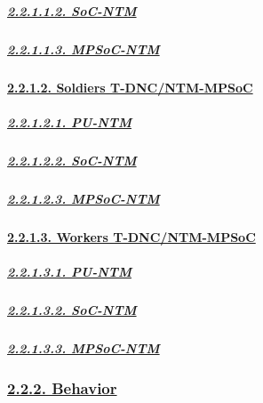 \documentclass[
]{article}
\begin{document}
\hypertarget{soc-ntm}{%
\subparagraph{\texorpdfstring{\protect\hyperlink{soc-ntm-3}{2.2.1.1.2.
SoC-NTM}}{2.2.1.1.2. SoC-NTM}}\label{soc-ntm}}

\hypertarget{mpsoc-ntm}{%
\subparagraph{\texorpdfstring{\protect\hyperlink{mpsoc-ntm-3}{2.2.1.1.3.
MPSoC-NTM}}{2.2.1.1.3. MPSoC-NTM}}\label{mpsoc-ntm}}

\hypertarget{soldiers-t-dncntm-mpsoc}{%
\paragraph{\texorpdfstring{\protect\hyperlink{soldiers-t-dncntm-mpsoc-1}{2.2.1.2.
Soldiers
T-DNC/NTM-MPSoC}}{2.2.1.2. Soldiers T-DNC/NTM-MPSoC}}\label{soldiers-t-dncntm-mpsoc}}

\hypertarget{pu-ntm-1}{%
\subparagraph{\texorpdfstring{\protect\hyperlink{pu-ntm-4}{2.2.1.2.1.
PU-NTM}}{2.2.1.2.1. PU-NTM}}\label{pu-ntm-1}}

\hypertarget{soc-ntm-1}{%
\subparagraph{\texorpdfstring{\protect\hyperlink{soc-ntm-4}{2.2.1.2.2.
SoC-NTM}}{2.2.1.2.2. SoC-NTM}}\label{soc-ntm-1}}

\hypertarget{mpsoc-ntm-1}{%
\subparagraph{\texorpdfstring{\protect\hyperlink{mpsoc-ntm-4}{2.2.1.2.3.
MPSoC-NTM}}{2.2.1.2.3. MPSoC-NTM}}\label{mpsoc-ntm-1}}

\hypertarget{workers-t-dncntm-mpsoc}{%
\paragraph{\texorpdfstring{\protect\hyperlink{workers-t-dncntm-mpsoc-1}{2.2.1.3.
Workers
T-DNC/NTM-MPSoC}}{2.2.1.3. Workers T-DNC/NTM-MPSoC}}\label{workers-t-dncntm-mpsoc}}

\hypertarget{pu-ntm-2}{%
\subparagraph{\texorpdfstring{\protect\hyperlink{pu-ntm-5}{2.2.1.3.1.
PU-NTM}}{2.2.1.3.1. PU-NTM}}\label{pu-ntm-2}}

\hypertarget{soc-ntm-2}{%
\subparagraph{\texorpdfstring{\protect\hyperlink{soc-ntm-5}{2.2.1.3.2.
SoC-NTM}}{2.2.1.3.2. SoC-NTM}}\label{soc-ntm-2}}

\hypertarget{mpsoc-ntm-2}{%
\subparagraph{\texorpdfstring{\protect\hyperlink{mpsoc-ntm-5}{2.2.1.3.3.
MPSoC-NTM}}{2.2.1.3.3. MPSoC-NTM}}\label{mpsoc-ntm-2}}

\hypertarget{behavior}{%
\subsubsection{\texorpdfstring{\protect\hyperlink{behavior-1}{2.2.2.
Behavior}}{2.2.2. Behavior}}\label{behavior}}
\end{document}
